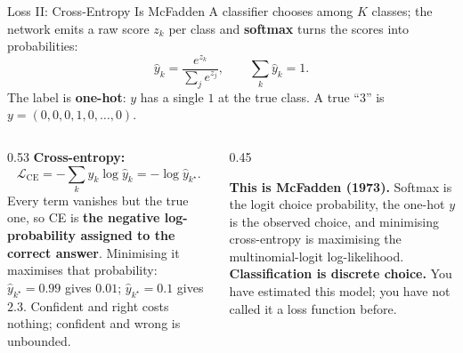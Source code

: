 \begin{frame}{Loss II: Cross-Entropy Is McFadden}
\footnotesize
A classifier chooses among $K$ classes; the network emits a raw score $z_k$ per class and \textbf{softmax} turns the scores into probabilities:
\[
  \hat y_k=\frac{e^{z_k}}{\sum_{j}e^{z_j}},\qquad \sum_k\hat y_k=1 .
\]
The label is \textbf{one-hot}: $y$ has a single $1$ at the true class. A true ``3'' is $y=(0,0,0,1,0,\dots,0)$.
\smallskip
\begin{columns}[T]
\begin{column}{0.53\textwidth}
\textbf{Cross-entropy:}
\[
  \mathcal{L}_{\text{CE}}=-\sum_k y_k\log\hat y_k=-\log\hat y_{k^{\star}} .
\]
Every term vanishes but the true one, so CE is \textbf{the negative log-probability assigned to the correct answer}. Minimising it maximises that probability: $\hat y_{k^{\star}}=0.99$ gives $0.01$; $\hat y_{k^{\star}}=0.1$ gives $2.3$. Confident and right costs nothing; confident and wrong is unbounded.
\end{column}
\begin{column}{0.45\textwidth}
\begin{takeawaybox}\footnotesize
\textbf{This is McFadden (1973).} Softmax is the logit choice probability, the one-hot $y$ is the observed choice, and minimising cross-entropy is maximising the multinomial-logit log-likelihood.
\medskip
\textbf{Classification is discrete choice.} You have estimated this model; you have not called it a loss function before.
\end{takeawaybox}
\end{column}
\end{columns}
\vspace{1mm}
\end{frame}

